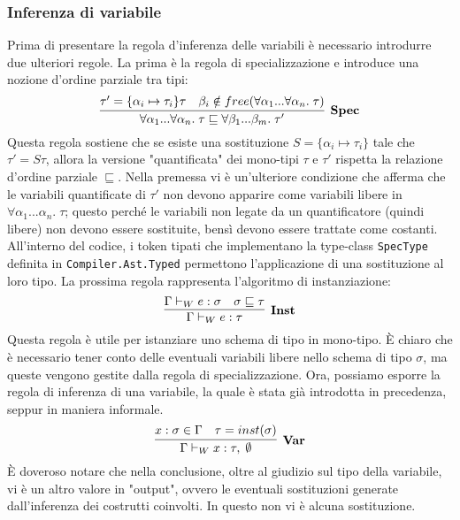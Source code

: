 \documentclass[10pt,a4paper]{article}
\begin{document}
\hypertarget{Inferenza di variabile}{\subsubsection{Inferenza di variabile}}
Prima di presentare la regola d'inferenza delle variabili è necessario introdurre due ulteriori regole. La prima è la
regola di specializzazione e introduce una nozione d'ordine parziale tra tipi:
\[ \infer[\textbf{Spec}]{\forall \alpha_1 ... \forall \alpha_n. \; \tau \sqsubseteq \forall \beta_1 ... \beta_m. \; \tau'}{\tau' = \{ \alpha_i \mapsto \tau_i \}\tau & \beta_i \notin free(\forall \alpha_1 ... \forall \alpha_n . \; \tau)} \]
Questa regola sostiene che se esiste una sostituzione $ S = \{ \alpha_i \mapsto \tau_i \} $ tale che $ \tau' = S \tau $,
allora la versione "quantificata" dei mono-tipi $ \tau $ e $ \tau' $ rispetta la relazione d'ordine parziale
$ \sqsubseteq $. Nella premessa vi è un'ulteriore condizione che afferma che le variabili quantificate di $ \tau' $
non devono apparire come variabili libere in $ \forall \alpha_1 ... \alpha_n. \; \tau $; questo perché le variabili
non legate da un quantificatore (quindi libere) non devono essere sostituite, bensì devono essere trattate come costanti.
All'interno del codice, i token tipati che implementano la type-class \texttt{SpecType} definita in \texttt{Compiler.Ast.Typed}
permettono l'applicazione di una sostituzione al loro tipo.
La prossima regola rappresenta l'algoritmo di instanziazione:
\[ \infer[\textbf{Inst}]{\Gamma \vdash_W e : \tau}{\Gamma \vdash_W e : \sigma & \sigma \sqsubseteq \tau} \]
Questa regola è utile per istanziare uno schema di tipo in mono-tipo. \`E chiaro che è necessario tener conto delle
eventuali variabili libere nello schema di tipo $ \sigma $, ma queste vengono gestite dalla regola di specializzazione.
Ora, possiamo esporre la regola di inferenza di una variabile, la quale è stata già introdotta in precedenza, seppur
in maniera informale.
\[ \infer[\textbf{Var}]{\Gamma \vdash_W x : \tau, \; \emptyset}{x : \sigma \in \Gamma & \tau = inst(\sigma)} \]
\`E doveroso notare che nella conclusione, oltre al giudizio sul tipo della variabile, vi è un altro valore in "output",
ovvero le eventuali sostituzioni generate dall'inferenza dei costrutti coinvolti. In questo non vi è alcuna sostituzione.
\end{document}
